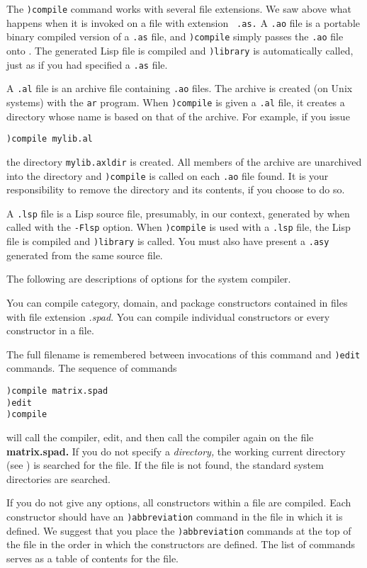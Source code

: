 The {\tt )compile} command works with several file extensions. We saw
above what happens when it is invoked on a file with extension {\tt
.as.} A {\tt .ao} file is a portable binary compiled version of a
{\tt .as} file, and {\tt )compile} simply passes the {\tt .ao} file
onto \aldor{}. The generated Lisp file is compiled and {\tt )library}
is automatically called, just as if you had specified a {\tt .as} file.

A {\tt .al} file is an archive file containing {\tt .ao} files. The
archive is created (on Unix systems) with the {\tt ar} program. When
{\tt )compile} is given a {\tt .al} file, it creates a directory whose
name is based on that of the archive. For example, if you issue
\begin{verbatim}
)compile mylib.al
\end{verbatim}
the directory {\tt mylib.axldir} is created. All
members of the archive are unarchived into the
directory and {\tt )compile} is called on each {\tt .ao} file found. It
is your responsibility to remove the directory and its contents, if you
choose to do so.

A {\tt .lsp} file is a Lisp source file, presumably, in our context,
generated by \aldor{} when called with the {\tt -Flsp} option. When
{\tt )compile} is used with a {\tt .lsp} file, the Lisp file is
compiled and {\tt )library} is called. You must also have present a
{\tt .asy} generated from the same source file.

The following are descriptions of options for the \Language{} system compiler.

You can compile category, domain, and package constructors
contained in files with file extension {\it .spad}.
You can compile individual constructors or every constructor
in a file.

The full filename is remembered between invocations of this command and
{\tt )edit} commands.
The sequence of commands
\begin{verbatim}
)compile matrix.spad
)edit
)compile
\end{verbatim}
will call the compiler, edit, and then call the compiler again
on the file {\bf matrix.spad.}
If you do not specify a {\it directory,} the working current
directory (see )
is searched for the file.
If the file is not found, the standard system directories are searched.

If you do not give any options, all constructors within a file are
compiled.
Each constructor should have an {\tt )abbreviation} command in
the file in which it is defined.
We suggest that you place the {\tt )abbreviation} commands at the
top of the file in the order in which the constructors are
defined.
The list of commands serves as a table of contents for the file.

